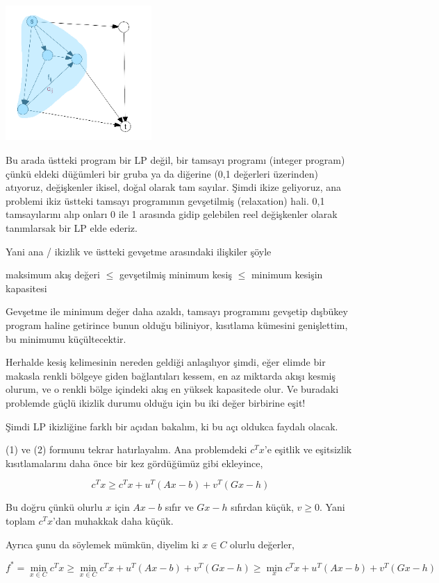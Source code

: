 \documentclass[12pt,fleqn]{article}\usepackage{../../common}
\begin{document}
\includegraphics[width=15em]{func_55_duality_03.png}

Bu arada üstteki program bir LP değil, bir tamsayı programı (integer
program) çünkü eldeki düğümleri bir gruba ya da diğerine (0,1 değerleri
üzerinden) atıyoruz, değişkenler ikisel, doğal olarak tam sayılar. Şimdi
ikize geliyoruz, ana problemi ikiz üstteki tamsayı programının gevşetilmiş
(relaxation) hali. 0,1 tamsayılarını alıp onları 0 ile 1 arasında gidip
gelebilen reel değişkenler olarak tanımlarsak bir LP elde ederiz. 

Yani ana / ikizlik ve üstteki gevşetme arasındaki ilişkiler şöyle

maksimum akış değeri $\le$ 
gevşetilmiş minimum kesiş $\le$ 
minimum kesişin kapasitesi

Gevşetme ile minimum değer daha azaldı, tamsayı programını gevşetip
dışbükey program haline getirince bunun olduğu biliniyor, kısıtlama
kümesini genişlettim, bu minimumu küçültecektir. 

Herhalde kesiş kelimesinin nereden geldiği anlaşılıyor şimdi, eğer elimde
bir makasla renkli bölgeye giden bağlantıları kessem, en az miktarda akışı
kesmiş olurum, ve o renkli bölge içindeki akış en yüksek kapasitede olur.
Ve buradaki problemde güçlü ikizlik durumu olduğu için bu iki değer
birbirine eşit! 

Şimdi LP ikizliğine farklı bir açıdan bakalım, ki bu açı oldukca faydalı
olacak. 

(1) ve (2) formunu tekrar hatırlayalım. Ana problemdeki $c^Tx$'e eşitlik ve
eşitsizlik  kısıtlamalarını daha önce bir kez gördüğümüz gibi ekleyince,

$$
c^T x \ge c^T x + u^T (Ax-b) + v^T (Gx-h)
$$

Bu doğru çünkü olurlu $x$ için $Ax-b$ sıfır ve $Gx-h$ sıfırdan küçük,
$v \ge 0$. Yani toplam $c^T x$'dan muhakkak daha küçük. 

Ayrıca şunu da söylemek mümkün, diyelim ki $x \in C$ olurlu değerler, 

$$
f^* = \min_{x \in C} c^T x \ge 
\min_{x \in C} c^T x + u^T (Ax-b) + v^T (Gx-h) \ge
\min_x c^T x + u^T (Ax-b) + v^T (Gx-h)
$$
\end{document}
